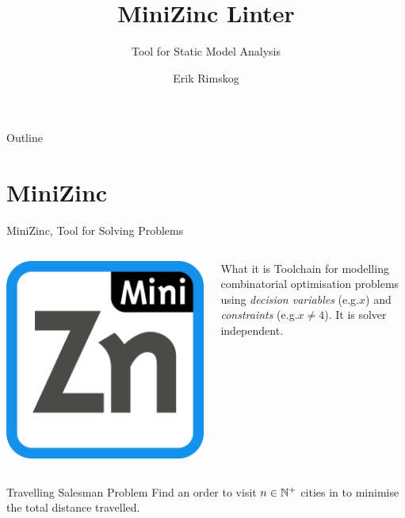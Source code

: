\documentclass[aspectratio=169]{beamer} %
\title{MiniZinc Linter}
\subtitle{Tool for Static Model Analysis}
\author{Erik Rimskog}
\institute{Uppsala University}
\date{}
\begin{document}
\begin{frame}
  \titlepage
\end{frame}

\begin{frame}{Outline}
  \tableofcontents
\end{frame}

\section{MiniZinc}
\begin{frame}{MiniZinc, Tool for Solving Problems}
  \begin{columns}[onlytextwidth]
    \includegraphics[width=\textwidth]{mznlogo.png}

    \begin{block}{What it is}
      Toolchain for modelling combinatorial optimisation problems\pause{} using \emph{decision variables} (e.g.\@ $x$) and \emph{constraints} (e.g.\@ $x\neq4$).\pause{} It is solver independent.
    \end{block}
  \end{columns}

  \vspace{0.75cm}
  \pause
  \begin{block}{Travelling Salesman Problem}
    Find an order to visit $n \in \mathbb{N}^+$ cities in to minimise the total distance travelled.
  \end{block}
\end{frame}
\end{document}
